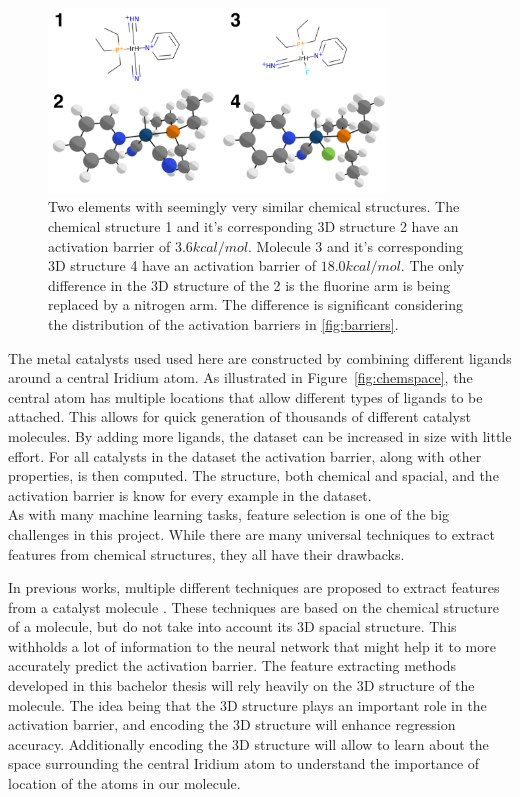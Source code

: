 \begin{figure}
  \centering
  \includegraphics[width=0.8\textwidth]{figures/introduction/elems_intro.png}
  \caption[Example of catalyst molecules]{Two elements with seemingly very similar chemical structures. The chemical structure 1 and it's corresponding 3D structure 2 have an activation barrier of $3.6 kcal/mol$.
  Molecule 3 and it's corresponding 3D structure 4 have an activation barrier of $18.0 kcal/mol$.
  The only difference in the 3D structure of the 2 is the fluorine arm is being replaced by a nitrogen arm.
  The difference is significant considering the distribution of the activation barriers in \ref{fig:barriers}.  }
  \label{fig:struct-diff}
\end{figure}


The metal catalysts used used here are constructed by combining different ligands around a central Iridium atom.
As illustrated in Figure~\ref{fig:chemspace}, the central atom has multiple locations that allow different types of ligands to be attached.  
This allows for quick generation of thousands of different catalyst molecules.
By adding more ligands, the dataset can be increased in size with little effort.
For all catalysts in the dataset the activation barrier, along with other properties, is then computed.
The structure, both chemical and spacial, and the activation barrier is know for every example in the dataset. 
\\
As with many machine learning tasks, feature selection is one of the big challenges in this project.
While there are many universal techniques to extract features from chemical structures, they all have their drawbacks.

In previous works, multiple different techniques are proposed to extract features from a catalyst molecule \cite{friederich_dos}.
These techniques are based on the chemical structure of a molecule, but do not take into account its 3D spacial structure.
This withholds a lot of information to the neural network that might help it to more accurately predict the activation barrier.
The feature extracting methods developed in this bachelor thesis will rely heavily on the 3D structure of the molecule.
The idea being that the 3D structure plays an important role in the activation barrier, and encoding the 3D structure will enhance regression accuracy.
Additionally encoding the 3D structure will allow to learn about the space surrounding the central 
Iridium atom to understand the importance of location of the atoms in our molecule.

